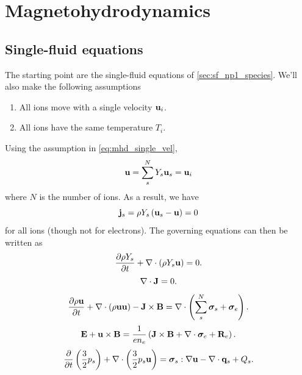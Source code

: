 \documentclass[a4paper,11pt]{report}
\begin{document}
\chapter{Magnetohydrodynamics}
\section{Single-fluid equations}
The starting point are the single-fluid equations of \cref{sec:sf_np1_species}. We'll also make the following assumptions
\begin{enumerate}
    \item All ions move with a single velocity $\mathbf{u}_i$. \label{eq:mhd_single_vel}
    \item All ions have the same temperature $T_i$. \label{eq:mhd_single_T}
\end{enumerate}
Using the assumption in \cref{eq:mhd_single_vel},
\begin{equation}
    \mathbf{u} = \sum_s^N Y_s \mathbf{u}_s = \mathbf{u}_i
\end{equation}
where $N$ is the number of ions. As a result, we have
\begin{equation}
    \mathbf{j}_s = \rho Y_s \left( \mathbf{u}_s - \mathbf{u} \right) = 0
\end{equation}
for all ions (though not for electrons). The governing equations can then be written as
\begin{equation*}
    \frac{\partial \rho Y_s}{\partial t} + \nabla \cdot \left( \rho Y_s \mathbf{u} \right) = 0.
\end{equation*}
\begin{equation*}
    \nabla \cdot \mathbf{J} = 0.
\end{equation*}
\begin{equation*}
    \frac{\partial \rho \mathbf{u}}{\partial t} + \nabla \cdot \left( \rho \mathbf{u} \mathbf{u} \right) - \mathbf{J} \times \mathbf{B} = \nabla \cdot \left( \sum_s^N \bm \sigma_s + \bm \sigma_e \right).
\end{equation*}
\begin{equation*}
    \mathbf{E} + \mathbf{u} \times \mathbf{B} = \frac{1}{e n_e} \left( \mathbf{J} \times \mathbf{B} + \nabla \cdot \bm \sigma_e + \mathbf{R}_e \right).
\end{equation*}
\begin{equation*}
    \frac{\partial}{\partial t} \left( \frac{3}{2} p_s \right) + \nabla \cdot \left( \frac{3}{2} p_s \mathbf{u} \right) = \bm \sigma_s : \nabla \mathbf{u} - \nabla \cdot \mathbf{q}_s + Q_s.
\end{equation*}
\end{document}
